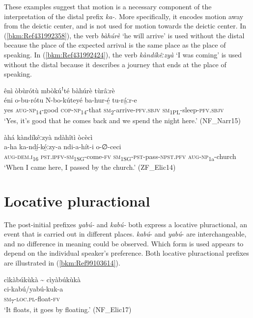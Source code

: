 These examples suggest that motion is a necessary component of the interpretation of the distal prefix \textit{ka-}. More specifically, it encodes motion away from the deictic center, and is not used for motion towards the deictic center. In (\ref{bkm:Ref431992358}), the verb \textit{bàhúrè} ‘he will arrive’ is used without the distal because the place of the expected arrival is the same place as the place of speaking. In (\ref{bkm:Ref431992424}), the verb \textit{kàndíkêːzyà} ‘I was coming’ is used without the distal because it describes a journey that ends at the place of speaking.

\ea
\label{bkm:Ref431992358}
ênì òbùrótù mbòkúꜝté bàhúrè tùrâːrè\\
\gll éni  o-bu-rótu    N-bo-kúteyé    ba-hur-é̲ tu-rá̲ːr-e \\
yes  \textsc{aug}-\textsc{np}\textsubscript{14}-good  \textsc{cop}-\textsc{np}\textsubscript{14}-that  \textsc{sm}\textsubscript{2}-arrive-\textsc{pfv}.\textsc{sbjv}
\textsc{sm}\textsubscript{1PL}-sleep-\textsc{pfv}.\textsc{sbjv}\\
\glt ‘Yes, it’s good that he comes back and we spend the night here.’ (NF\_Narr15)
\z

\ea
\label{bkm:Ref431992424}
àhá kàndíkêːzyà ndàhîtì òcècì\\
\gll a-ha    ka-ndí̲-ké̲ːzy-a ndi-a-hít-i      o-∅-ceci\\
\textsc{aug}-\textsc{dem}.\textsc{i}\textsubscript{16} \textsc{pst}.\textsc{ipfv}-\textsc{sm}\textsubscript{1SG}-come-\textsc{fv}
\textsc{sm}\textsubscript{{\textasciigrave}1SG}-\textsc{pst}-pass-\textsc{npst}.\textsc{pfv}  \textsc{aug}-\textsc{np}\textsubscript{1a}-church\\
\glt ‘When I came here, I passed by the church.’ (ZF\_Elic14)
\z
\section{Locative pluractional}
\label{bkm:Ref494442567}\hypertarget{Toc75352705}{}
The post-initial prefixes \textit{yabú-} and \textit{kabú-} both express a locative pluractional, an event that is carried out in different places. \textit{kabú}- and \textit{yabú}- are interchangeable, and no difference in meaning could be observed. Which form is used appears to depend on the individual speaker’s preference. Both locative pluractional prefixes are illustrated in (\ref{bkm:Ref99103614}).

\ea
\label{bkm:Ref99103614}
cìkàbúkùkà {\textasciitilde} cìyàbúkùkà\\
\gll ci-kabú/yabú-kuk-a\\
\textsc{sm}\textsubscript{7}-\textsc{loc}.\textsc{pl}-float-\textsc{fv}\\
\glt ‘It floats, it goes by floating.’ (NF\_Elic17)
\z

